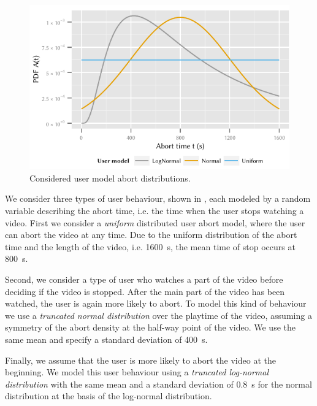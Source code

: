 \begin{figure}
\begin{center}
  \includegraphics{application/lte_video/system_model/figures/abort_distributions}
  \caption{Considered user model abort distributions.}
  \label{fig:application:lte_video:system_model:model_assumptions:metrics:abort_distributions}
\end{center}
\end{figure}

We consider three types of user behaviour, shown in , each modeled by a random variable describing the abort time, i.e. the time when the user stops watching a video.
First we consider a \emph{uniform} distributed user abort model, where the user can abort the video at any time.
Due to the uniform distribution of the abort time and the length of the video, i.e. \SI{1600}{\second}, the mean time of stop occurs at \SI{800}{\second}.

Second, we consider a type of user who watches a part of the video before deciding if the video is stopped. 
After the main part of the video has been watched, the user is again more likely to abort.
To model this kind of behaviour we use a \emph{truncated normal distribution} over the playtime of the video, assuming a symmetry of the abort density at the half-way point of the video.
We use the same mean and specify a standard deviation of \SI{400}{\second}.

Finally, we assume that the user is more likely to abort the video at the beginning.
We model this user behaviour using a \emph{truncated log-normal distribution} with the same mean and a standard deviation of \SI{0.8}{\second} for the normal distribution at the basis of the log-normal distribution.

